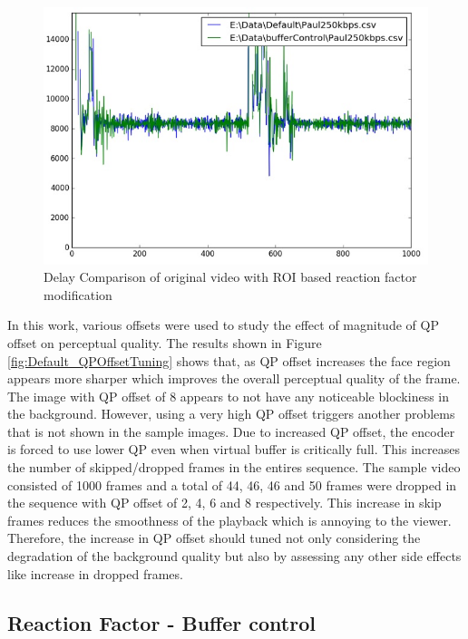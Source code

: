 \documentclass[11pt]{article} %
\begin{document}
\begin{figure}[!h]
    \centering
    \includegraphics[scale=0.75]{BufferControl/Paul250kbps_Buffer_Control_Delay}
    \caption{Delay Comparison of original video with ROI based reaction factor modification}
    \label{fig:DelayDefault_BufferControltCompare}
\end{figure}

In this work, various offsets were used to study the effect of magnitude of QP offset on perceptual quality. The results shown in Figure \ref{fig:Default_QPOffsetTuning} shows that, as QP offset increases the face region appears more sharper which improves the overall perceptual quality of the frame. The image with QP offset of 8 appears to not have any noticeable blockiness in the background. However, using a very high QP offset triggers another problems that is not shown in the sample images. Due to increased QP offset, the encoder is forced to use lower QP even when virtual buffer is critically full. This increases the number of skipped/dropped frames in the entires sequence. The sample video consisted of 1000 frames and a total of 44, 46, 46 and 50 frames were dropped in the sequence with QP offset of 2, 4, 6 and 8 respectively. This increase in skip frames reduces the smoothness of the playback which is annoying to the viewer. Therefore, the increase in QP offset should tuned not only considering the degradation of the background quality but also by assessing any other side effects like increase in dropped frames.
\subsection{Reaction Factor - Buffer control} 
\end{document}
